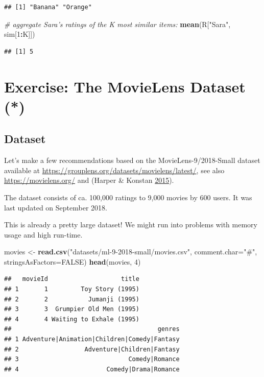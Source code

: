 \documentclass[10pt,b5paper,krantz1]{krantz}
\newenvironment{Shaded}{\begin{snugshade}}{\end{snugshade}}
\newcommand{\CommentTok}[1]{\textcolor[rgb]{0.37,0.37,0.37}{\textit{#1}}}
\newcommand{\DataTypeTok}[1]{\textcolor[rgb]{0.27,0.27,0.27}{#1}}
\newcommand{\DecValTok}[1]{\textcolor[rgb]{0.06,0.06,0.06}{#1}}
\newcommand{\KeywordTok}[1]{\textcolor[rgb]{0.27,0.27,0.27}{\textbf{#1}}}
\newcommand{\NormalTok}[1]{#1}
\newcommand{\OperatorTok}[1]{\textcolor[rgb]{0.43,0.43,0.43}{\textbf{#1}}}
\newcommand{\OtherTok}[1]{\textcolor[rgb]{0.37,0.37,0.37}{#1}}
\newcommand{\StringTok}[1]{\textcolor[rgb]{0.5,0.5,0.5}{#1}}
\begin{document}
\begin{verbatim}
## [1] "Banana" "Orange"
\end{verbatim}

\begin{Shaded}
\begin{Highlighting}[]
\CommentTok{# aggregate Sara's ratings of the K most similar items:}
\KeywordTok{mean}\NormalTok{(R[}\StringTok{"Sara"}\NormalTok{, sim[}\DecValTok{1}\OperatorTok{:}\NormalTok{K]])}
\end{Highlighting}
\end{Shaded}

\begin{verbatim}
## [1] 5
\end{verbatim}

\hypertarget{exercise-the-movielens-dataset}{%
\section{Exercise: The MovieLens Dataset (*)}\label{exercise-the-movielens-dataset}}

\hypertarget{dataset}{%
\subsection{Dataset}\label{dataset}}

Let's make a few recommendations based on the MovieLens-9/2018-Small
dataset available at
\url{https://grouplens.org/datasets/movielens/latest/},
see also \url{https://movielens.org/} and (Harper \& Konstan \protect\hyperlink{ref-movielens}{2015}).

The dataset consists of
ca. 100,000 ratings to 9,000 movies by 600 users. It was last updated
on September 2018.

This is already a pretty large dataset! We might run into problems
with memory usage and high run-time.

\begin{Shaded}
\begin{Highlighting}[]
\NormalTok{movies <-}\StringTok{ }\KeywordTok{read.csv}\NormalTok{(}\StringTok{"datasets/ml-9-2018-small/movies.csv"}\NormalTok{,}
    \DataTypeTok{comment.char=}\StringTok{"#"}\NormalTok{, }\DataTypeTok{stringsAsFactors=}\OtherTok{FALSE}\NormalTok{)}
\KeywordTok{head}\NormalTok{(movies, }\DecValTok{4}\NormalTok{)}
\end{Highlighting}
\end{Shaded}

\begin{verbatim}
##   movieId                    title
## 1       1         Toy Story (1995)
## 2       2           Jumanji (1995)
## 3       3  Grumpier Old Men (1995)
## 4       4 Waiting to Exhale (1995)
##                                        genres
## 1 Adventure|Animation|Children|Comedy|Fantasy
## 2                  Adventure|Children|Fantasy
## 3                              Comedy|Romance
## 4                        Comedy|Drama|Romance
\end{verbatim}
\end{document}
